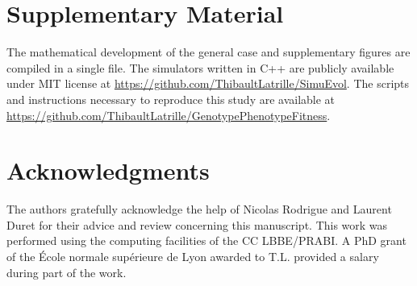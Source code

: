 \documentclass[a4paper]{MBE}
\begin{document}
\maketitle




\section{Supplementary Material}
The mathematical development of the general case and supplementary figures are compiled in a single file.
The simulators written in C++ are publicly available under MIT license at \url{https://github.com/ThibaultLatrille/SimuEvol}.
The scripts and instructions necessary to reproduce this study are available at \url{https://github.com/ThibaultLatrille/GenotypePhenotypeFitness}.

\section{Acknowledgments}

The authors gratefully acknowledge the help of Nicolas Rodrigue and Laurent Duret for their advice and review concerning this manuscript.
This work was performed using the computing facilities of the CC LBBE/PRABI.
A PhD grant of the École normale supérieure de Lyon awarded to T.L.
provided a salary during part of the work.


\end{document}
